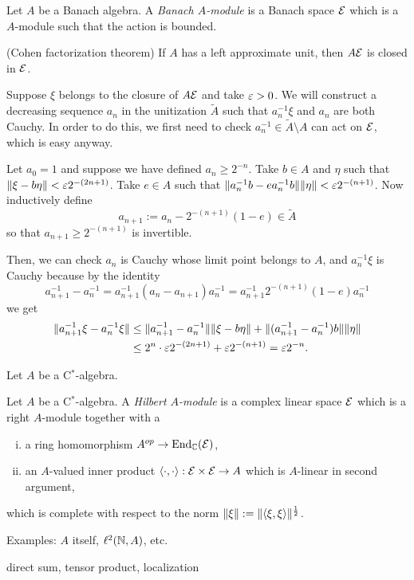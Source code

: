 \documentclass{../../large}
\begin{document}
\begin{prb}
Let $A$ be a Banach algebra.
A \emph{Banach $A$-module} is a Banach space $\mathcal{E}$ which is a $A$-module such that the action is bounded.
\begin{parts}
\item (Cohen factorization theorem) If $A$ has a left approximate unit, then $A\mathcal{E}$ is closed in $\mathcal{E}$.
\end{parts}
\end{prb}
\begin{pf}
Suppose $\xi$ belongs to the closure of $A\mathcal{E}$ and take $\varepsilon>0$.
We will construct a decreasing sequence $a_n$ in the unitization $\tilde A$ such that $a_n^{-1}\xi$ and $a_n$ are both Cauchy.
In order to do this, we first need to check $a_n^{-1}\in\tilde A\setminus A$ can act on $\mathcal{E}$, which is easy anyway.

Let $a_0=1$ and suppose we have defined $a_n\ge 2^{-n}$.
Take $b\in A$ and $\eta$ such that $\|\xi-b\eta\|<\varepsilon2^{-(2n+1)}$.
Take $e\in A$ such that $\|a_n^{-1}b-ea_n^{-1}b\|\|\eta\|<\varepsilon2^{-(n+1)}$.
Now inductively define
\[a_{n+1}:=a_n-2^{-(n+1)}(1-e)\in\tilde A\]
so that $a_{n+1}\ge2^{-(n+1)}$ is invertible.

Then, we can check $a_n$ is Cauchy whose limit point belongs to $A$, and
$a_n^{-1}\xi$ is Cauchy because by the identity
\[a_{n+1}^{-1}-a_n^{-1}=a_{n+1}^{-1}(a_n-a_{n+1})a_n^{-1}=a_{n+1}^{-1}2^{-(n+1)}(1-e)a_n^{-1}\]
we get
\begin{align*}
\|a_{n+1}^{-1}\xi-a_n^{-1}\xi\|
&\le\|a_{n+1}^{-1}-a_n^{-1}\|\|\xi-b\eta\|+\|(a_{n+1}^{-1}-a_n^{-1})b\|\|\eta\|\\
&\le2^n\cdot\varepsilon2^{-(2n+1)}+\varepsilon2^{-(n+1)}=\varepsilon2^{-n}.
\end{align*}
\end{pf}

\begin{prb}
Let $A$ be a C$^*$-algebra.
\end{prb}

\begin{prb}
Let $A$ be a C$^*$-algebra.
A \emph{Hilbert $A$-module} is a complex linear space $\mathcal{E}$ which is a right $A$-module together with a
\begin{enumerate}[(i)]
\item a ring homomorphism $A^{op}\to\operatorname{End}_{\mathbb{C}}(\mathcal{E})$,
\item an $A$-valued inner product $\langle\cdot,\cdot\rangle:\mathcal{E}\times\mathcal{E}\to A$ which is $A$-linear in second argument,
\end{enumerate}
which is complete with respect to the norm $\|\xi\|:=\|\langle\xi,\xi\rangle\|^{\frac12}$.
\begin{parts}
\item Examples: $A$ itself, $\ell^2(\mathbb{N},A)$, etc.
\item direct sum, tensor product, localization
\end{parts}
\end{prb}
\end{document}
